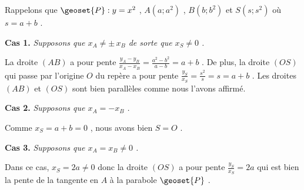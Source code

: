 Rappelons que $\geoset{P} : y = x^2$ , $A(a ; a^2)$ , $B(b ; b^2)$ et $S(s ; s^2)$ où $s = a + b$ .



\bigskip

\textbf{Cas 1.} \emph{Supposons que $x_A \neq \pm \, x_B$ de sorte que $x_S \neq 0$ .}

\medskip

La droite $(AB)$ a pour pente
$\frac{y_A - y_B}{x_A - x_B} = \frac{a^2 - b^2}{a - b} = a + b$ .
De plus, la droite $(OS)$ qui passe par l'origine $O$ du repère a pour pente
$\frac{y_S}{x_S} = \frac{s^2}{s} = s = a + b$ .
Les droites $(AB)$ et $(OS)$ sont bien parallèles comme nous l'avons affirmé.


\bigskip

\textbf{Cas 2.} \emph{Supposons que $x_A = - x_B$ .}

\medskip

Comme $x_S = a + b = 0$ , nous avons bien $S = O$ .


\bigskip

\textbf{Cas 3.} \emph{Supposons que $x_A = x_B \neq 0$ .}

\medskip

Dans ce cas, $x_S = 2a \neq 0$ donc la droite $(OS)$ a pour pente
$\frac{y_S}{x_S} = 2a$ qui est bien la pente de la tangente en $A$ à la parabole $\geoset{P}$ .